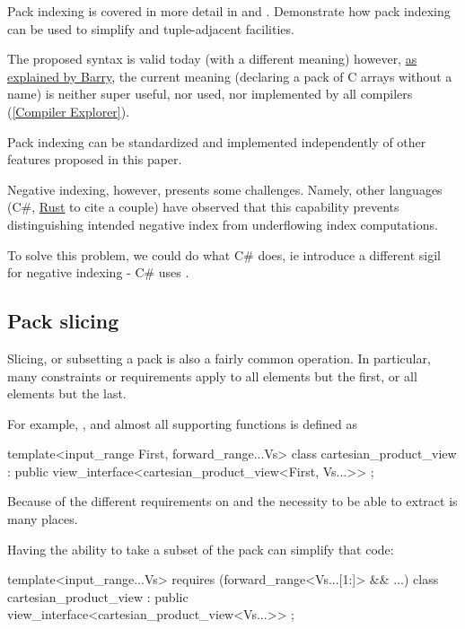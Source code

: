 \documentclass{wg21}
\begin{document}
Pack indexing is covered in more detail in  and \cite{P2662R0} .  Demonstrate how pack indexing can be used to simplify
 and tuple-adjacent facilities.

The proposed syntax is valid today (with a different meaning) however, \href{https://www.open-std.org/jtc1/sc22/wg21/docs/papers/2020/p1858r2.html#pack-indexing-ambiguity}{as explained by Barry},
the current meaning (declaring a pack of C arrays without a name) is neither super useful, nor used, nor implemented by all compilers (\href{https://godbolt.org/z/6obhffPTP}{[Compiler Explorer]}).

Pack indexing can be standardized and implemented independently of other features proposed in this paper.

Negative indexing, however, presents some challenges.
Namely, other languages (C\#, \href{https://github.com/rust-lang/rfcs/issues/2249#issuecomment-352128826}{Rust} to cite a couple) have observed that this capability prevents distinguishing intended negative index from underflowing index computations.

To solve this problem, we could do what C\# does, ie introduce a different sigil for negative indexing - C\# uses \tcode{\caret}.

\subsection{Pack slicing}
\label{sec:packslicing}

Slicing, or subsetting a pack is also a fairly common operation.
In particular, many constraints or requirements apply to all elements but the first, or all elements but the last.

For example, , and almost all supporting functions is defined as

\begin{colorblock}
template<input_range First, forward_range...Vs>
class cartesian_product_view : public view_interface<cartesian_product_view<First, Vs...>> {};
\end{colorblock}

Because of the different requirements on  and the necessity to be able to extract 
is many places.

Having the ability to take a subset of the pack can simplify that code:

\begin{colorblock}
template<input_range...Vs>
requires (forward_range<Vs...[1:]> && ...)
class cartesian_product_view : public view_interface<cartesian_product_view<Vs...>> {};
\end{colorblock}
\end{document}
